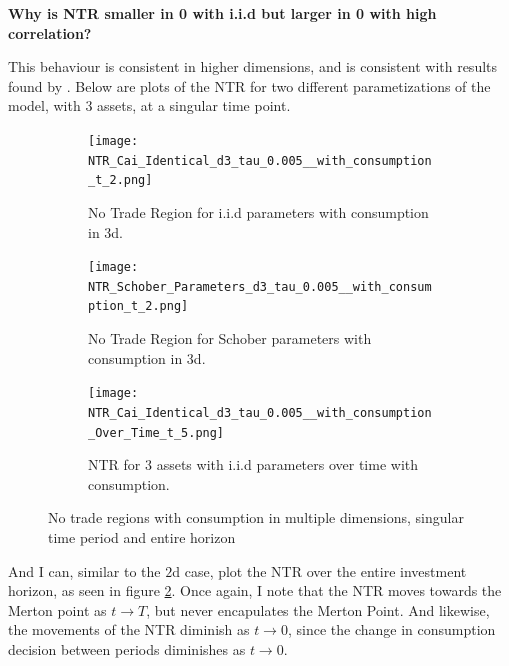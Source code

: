 \documentclass[11pt]{article}
\begin{document}
\textbf{Why is NTR smaller in 0 with i.i.d but larger in 0 with high correlation?}

This behaviour is consistent in higher dimensions, and is consistent with results found by \autocite{Scheidegger2023}.
Below are plots of the NTR for two different parametizations of the model, with $3$ assets, at a singular time point.
\begin{figure}[!ht]
    \centering
    \begin{subfigure}[t]{0.48\textwidth}
        \centering
        \texttt{[image: NTR\_Cai\_Identical\_d3\_tau\_0.005\_\_with\_consumption\_t\_2.png]}
        \caption{No Trade Region for i.i.d parameters with consumption in 3d.}
    \end{subfigure}%
    \hfill
    \begin{subfigure}[t]{0.48\textwidth}
        \centering
        \texttt{[image: NTR\_Schober\_Parameters\_d3\_tau\_0.005\_\_with\_consumption\_t\_2.png]}
        \caption{No Trade Region for Schober parameters with consumption in 3d.}
    \end{subfigure}
    \vspace{1em}
    \begin{subfigure}[t]{0.48\textwidth}
        \centering
        \texttt{[image: NTR\_Cai\_Identical\_d3\_tau\_0.005\_\_with\_consumption\_Over\_Time\_t\_5.png]}
        \caption{NTR for $3$ assets with i.i.d parameters over time with consumption.}
        \label{fig: NTR_3d_iid_with_consumption_over_time}
    \end{subfigure}
    \caption{No trade regions with consumption in multiple dimensions, singular time period and entire horizon}
\end{figure}
And I can, similar to the $2$d case, plot the \ac{NTR} over the entire investment horizon, as seen in figure \ref{fig: NTR_3d_iid_with_consumption_over_time}.
Once again, I note that the NTR moves towards the Merton point as $t \rightarrow T$, but never encapulates the Merton Point.
And likewise, the movements of the NTR diminish as $t \to 0$, since the change in consumption decision between periods diminishes as $t \to 0$.
\end{document}
